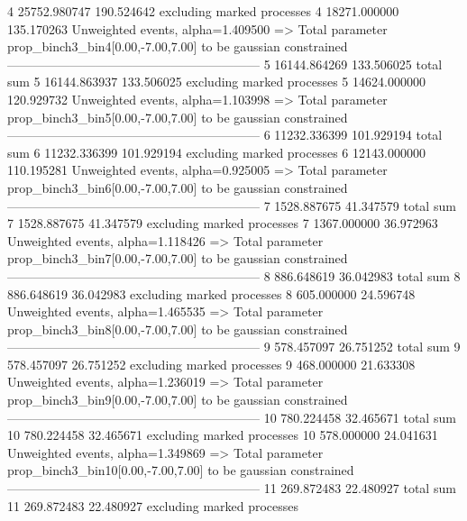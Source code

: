 4          25752.980747    190.524642      excluding marked processes    
4          18271.000000    135.170263      Unweighted events, alpha=1.409500
  => Total parameter prop_binch3_bin4[0.00,-7.00,7.00] to be gaussian constrained
------------------------------------------------------------
5          16144.864269    133.506025      total sum                     
5          16144.863937    133.506025      excluding marked processes    
5          14624.000000    120.929732      Unweighted events, alpha=1.103998
  => Total parameter prop_binch3_bin5[0.00,-7.00,7.00] to be gaussian constrained
------------------------------------------------------------
6          11232.336399    101.929194      total sum                     
6          11232.336399    101.929194      excluding marked processes    
6          12143.000000    110.195281      Unweighted events, alpha=0.925005
  => Total parameter prop_binch3_bin6[0.00,-7.00,7.00] to be gaussian constrained
------------------------------------------------------------
7          1528.887675     41.347579       total sum                     
7          1528.887675     41.347579       excluding marked processes    
7          1367.000000     36.972963       Unweighted events, alpha=1.118426
  => Total parameter prop_binch3_bin7[0.00,-7.00,7.00] to be gaussian constrained
------------------------------------------------------------
8          886.648619      36.042983       total sum                     
8          886.648619      36.042983       excluding marked processes    
8          605.000000      24.596748       Unweighted events, alpha=1.465535
  => Total parameter prop_binch3_bin8[0.00,-7.00,7.00] to be gaussian constrained
------------------------------------------------------------
9          578.457097      26.751252       total sum                     
9          578.457097      26.751252       excluding marked processes    
9          468.000000      21.633308       Unweighted events, alpha=1.236019
  => Total parameter prop_binch3_bin9[0.00,-7.00,7.00] to be gaussian constrained
------------------------------------------------------------
10         780.224458      32.465671       total sum                     
10         780.224458      32.465671       excluding marked processes    
10         578.000000      24.041631       Unweighted events, alpha=1.349869
  => Total parameter prop_binch3_bin10[0.00,-7.00,7.00] to be gaussian constrained
------------------------------------------------------------
11         269.872483      22.480927       total sum                     
11         269.872483      22.480927       excluding marked processes    
